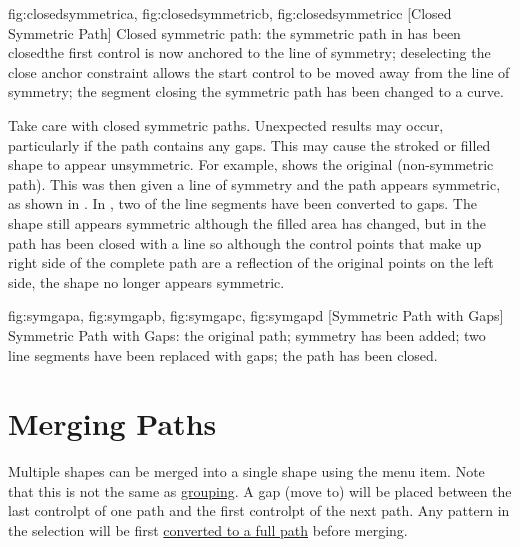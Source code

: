 {
 {fig:closedsymmetrica}{}{},
 {fig:closedsymmetricb}{}{},
 {fig:closedsymmetricc}{}{}
}
[Closed Symmetric Path]
{Closed symmetric path:  the symmetric path in
 has been closed\dash the
first control is now anchored to the line of symmetry;
 deselecting the close anchor constraint allows
the start control to be moved away from the line of symmetry;
 the segment closing the symmetric path has been
changed to a curve.}

\begin{warning}
Take care with closed symmetric paths. Unexpected results
may occur, particularly if the path contains any gaps. This may
cause the stroked or filled shape to appear unsymmetric.
For example,  shows the original
(non-symmetric path). This was then given a line of symmetry and
the path appears symmetric, as shown in . In
, two of the line segments have been
converted to gaps. The shape still appears symmetric although the
filled area has changed, but in  the path
has been closed with a line so although the control points that
make up right side of the complete path are a reflection of the
original points on the left side, the shape no longer appears
symmetric.
\end{warning}

{
  {fig:symgapa}{}{},
  {fig:symgapb}{}{},
  {fig:symgapc}{}{},
  {fig:symgapd}{}{}
}
[Symmetric Path with Gaps]
{Symmetric Path with Gaps:
 the original path;
 symmetry has been added;
 two line segments have been replaced with gaps;
 the path has been closed.}


\section{Merging Paths}\label{sec:mergepaths}


Multiple \glspl{shape} can be merged into a single \gls*{shape}
using the  menu item. Note that this is not
the same as \hyperref[sec:grouping]{grouping}.  A \gls{gap} (move
to) will be placed between the last \gls{controlpt} of one path and
the first \gls*{controlpt} of the next path. Any \gls{pattern} in
the selection will be first \hyperref[sec:converttofullpath]{converted
to a full path} before merging.

